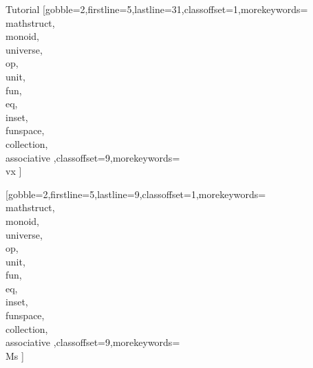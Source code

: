 \documentclass{stex}
\begin{document}
\begin{sfragment}{Tutorial}
    [gobble=2,firstline=5,lastline=31,classoffset=1,morekeywords={
    \\mathstruct,\\monoid,\\universe,\\op,\\unit,\\fun,\\eq,\\inset,
    \\funspace,\\collection,\\associative
    },classoffset=9,morekeywords={
      \\vx
    }]

    [gobble=2,firstline=5,lastline=9,classoffset=1,morekeywords={
    \\mathstruct,\\monoid,\\universe,\\op,\\unit,\\fun,\\eq,\\inset,
    \\funspace,\\collection,\\associative
    },classoffset=9,morekeywords={
      \\Ms
    }]

  \end{sfragment}
  
\end{document}
